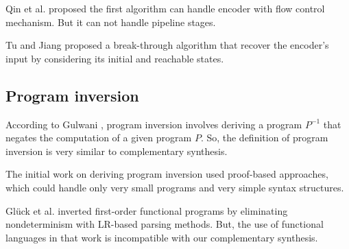 \documentclass[runningheads,a4paper,orivec]{llncs}
\begin{document}
Qin et al. \cite{QinTODAES15}
proposed the first algorithm can handle encoder with flow control mechanism.
But it can not handle pipeline stages.

Tu and Jiang \cite{TuDAC13} proposed a break-through algorithm 
that recover the encoder's input by considering its initial and reachable states.


\subsection{Program inversion}\label{subsec_proinv}
According to Gulwani \cite{dim_syn},
program inversion involves deriving a program $P^{-1}$
that negates the computation of a given program $P$.
So,
the definition of program inversion is very similar to complementary synthesis.

The initial work on deriving program inversion used proof-based approaches\cite{prog_inv},
which could handle only very small programs and very simple syntax structures.

Gl\"{u}ck et al. \cite{mtd_autoProginv} inverted first-order functional programs
by eliminating nondeterminism with LR-based parsing methods.
But,
the use of functional languages in that work is incompatible with our complementary synthesis.
\end{document}
